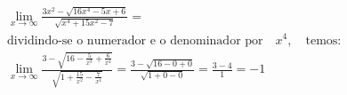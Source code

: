 \begin{ex}
\begin{align}
&\lim_{x\rightarrow \infty} \frac{3x^2-\sqrt{16x^4-5x+6}}{\sqrt{x^4+15x^2-7}}=\nonumber\\
&\text{dividindo-se o numerador e o denominador por}\quad x^4,\quad\text{temos:}\nonumber\\
&\lim_{x\rightarrow \infty} \frac{3-\sqrt{16-\frac{5}{x^3}+\frac{6}{x^4}}}{\sqrt{1+\frac{15}{x^2}-\frac{7}{x^4}}}=\frac{3-\sqrt{16-0+0}}{\sqrt{1+0-0}}=\frac{3-4}{1}=-1\nonumber
\end{align}
\end{ex}